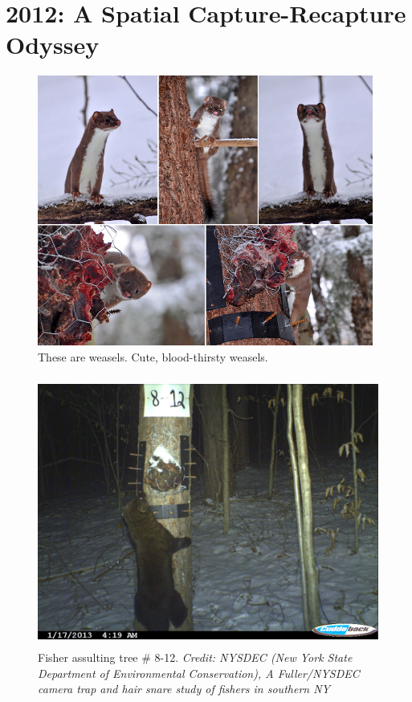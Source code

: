 


\chapter{
 2012: A Spatial Capture-Recapture Odyssey
 }

\label{chapt.final}

\vspace{0.3cm}


\vspace{2in}



\begin{figure}[h!]
\centering
\includegraphics[height=3.5in]{Ch20-Last/Chp20picturearray.jpg}
\caption{
These are weasels. Cute, blood-thirsty weasels.
}
\label{fig.weasels}
\end{figure}


\begin{figure}[h!]
\centering
\includegraphics[height=3.5in]{Ch20-Last/fisher.jpg}
\caption{
Fisher assulting tree \# 8-12.
{\it Credit: NYSDEC (New York State Department of Environmental Conservation),
A Fuller/NYSDEC camera trap and hair snare study of fishers in
southern NY}
}
\label{fig.fisher}
\end{figure}


